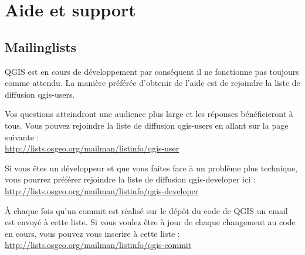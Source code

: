 
\section{Aide et support}\label{label_helpsupport}


\subsection{Mailinglists}
QGIS est en cours de d\'eveloppement par cons\'equent il ne fonctionne pas toujours
comme attendu. La mani\`ere pr\'ef\'er\'ee d'obtenir de l'aide est de rejoindre la
liste de diffusion qgis-users.

Vos questions atteindront une audience plus large et les r\'eponses b\'en\'eficieront
\`a tous. Vous pouvez rejoindre la liste de diffusion qgis-users en allant sur la
page suivante : \\
\url{http://lists.osgeo.org/mailman/listinfo/qgis-user}

Si vous \^etes un d\'eveloppeur et que vous faites face \`a un probl\`eme plus
technique, vous pourrez pr\'ef\'erer rejoindre la liste de diffusion qgis-developer
ici :\\
\url{http://lists.osgeo.org/mailman/listinfo/qgis-developer}

\`A chaque fois qu'un commit est r\'ealis\'e sur le d\'ep\^ot du code de QGIS un email
est envoy\'e \`a cette liste. Si vous voulez \^etre \`a jour de chaque changement au
code en cours, vous pouvez vous inscrire \`a cette liste :\\
\url{http://lists.osgeo.org/mailman/listinfo/qgis-commit}

